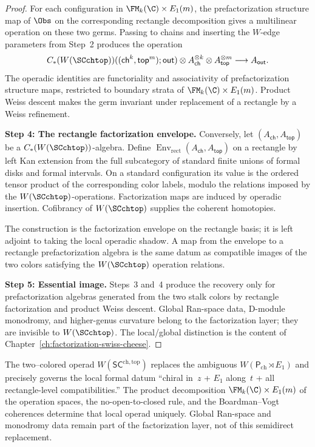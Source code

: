 \begin{proof}
For each configuration in $\FM_k(\C)\times E_1(m)$, the
prefactorization structure map of $\Obs$ on the corresponding
rectangle decomposition gives a multilinear operation on these two
germs. Passing to chains and inserting the $W$-edge parameters from
Step~2 produces the operation
\[
 C_\ast(W(\SCchtop))((\mathsf{ch}^k,\mathsf{top}^m);\mathsf{out})
 \otimes A_{\mathsf{ch}}^{\otimes k}
 \otimes A_{\mathsf{top}}^{\otimes m}
 \longrightarrow A_{\mathsf{out}} .
\]
The operadic identities are functoriality and associativity of
prefactorization structure maps, restricted to boundary strata of
$\FM_k(\C)\times E_1(m)$. Product Weiss descent makes the germ
invariant under replacement of a rectangle by a Weiss refinement.

\medskip\noindent
\textbf{Step 4: The rectangle factorization envelope.}
Conversely, let $(A_{\mathsf{ch}},A_{\mathsf{top}})$ be a
$C_\ast(W(\SCchtop))$-algebra. Define
$\operatorname{Env}_{\mathrm{rect}}(A_{\mathsf{ch}},A_{\mathsf{top}})$ on a
rectangle by left Kan extension from the full subcategory of
standard finite unions of formal disks and formal intervals. On a
standard configuration its value is the ordered tensor product of the
corresponding color labels, modulo the relations imposed by the
$W(\SCchtop)$-operations. Factorization maps are induced by operadic
insertion. Cofibrancy of $W(\SCchtop)$ supplies the coherent
homotopies.

The construction is the factorization envelope on the rectangle
basis; it is left adjoint to taking the local operadic shadow. A
map from the envelope to a rectangle prefactorization algebra is the
same datum as compatible images of the two colors satisfying the
$W(\SCchtop)$ operation relations.

\medskip\noindent
\textbf{Step 5: Essential image.}
Steps~3 and~4 produce the recovery only for prefactorization
algebras generated from the two stalk colors by rectangle
factorization and product Weiss descent. Global Ran-space data,
D-module monodromy, and higher-genus curvature belong to the
factorization layer; they are invisible to $W(\SCchtop)$. The
local/global distinction is the content of
Chapter~\ref{ch:factorization-swiss-cheese}.
\qedhere
\end{proof}

\begin{corollary}
\label{cor:clean-replacement}
The two--colored operad $W(\mathsf{SC}^{\mathrm{ch,top}})$ replaces the ambiguous $W(\mathsf P_{\mathrm{ch}}\rtimes E_1)$ and precisely governs the local formal datum ``chiral in~$z$ + $E_1$ along~$t$ + all rectangle-level compatibilities.'' The product decomposition $\FM_k(\C) \times E_1(m)$ of the operation spaces, the no-open-to-closed rule, and the Boardman--Vogt coherences determine that local operad uniquely. Global Ran-space and monodromy data remain part of the factorization layer, not of this semidirect replacement.
\end{corollary}

